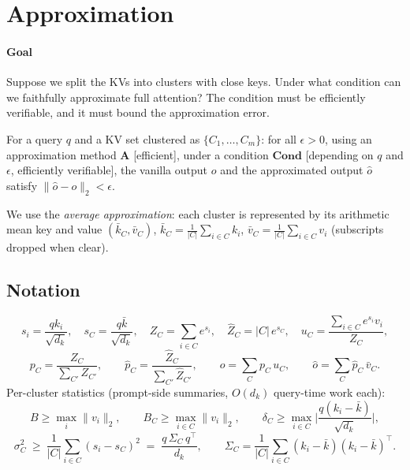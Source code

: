 
\section{Approximation}

\paragraph{Goal}
Suppose we split the KVs into clusters with close keys. Under what condition can we
faithfully approximate full attention? The condition must be efficiently verifiable,
and it must bound the approximation error.

\begin{tcolorbox}[colback=white, colframe=black, arc=0mm, boxrule=0.5pt]
For a query $q$ and a KV set clustered as $\{C_1,\dots,C_m\}$: for all $\epsilon > 0$,
using an approximation method $\mathbf{A}$ [efficient], under a condition
$\mathbf{Cond}$ [depending on $q$ and $\epsilon$, efficiently verifiable], the vanilla
output $o$ and the approximated output $\hat o$ satisfy
$\|\hat o - o\|_2 < \epsilon$.
\end{tcolorbox}

We use the \emph{average approximation}: each cluster is represented by its arithmetic
mean key and value $(\bar k_C, \bar v_C)$, $\bar k_C = \frac{1}{|C|}\sum_{i\in C} k_i$,
$\bar v_C = \frac{1}{|C|}\sum_{i\in C} v_i$ (subscripts dropped when clear).

\subsection{Notation}

\[
s_i = \frac{q k_i}{\sqrt{d_k}}, \quad
s_C = \frac{q \bar k}{\sqrt{d_k}}, \quad
Z_C = \sum_{i\in C} e^{s_i}, \quad
\hat Z_C = |C|\, e^{s_C}, \quad
u_C = \frac{\sum_{i\in C} e^{s_i} v_i}{Z_C},
\]
\[
p_C = \frac{Z_C}{\sum_{C'} Z_{C'}}, \qquad
\hat p_C = \frac{\hat Z_C}{\sum_{C'} \hat Z_{C'}}, \qquad
o = \sum_C p_C\, u_C, \qquad
\hat o = \sum_C \hat p_C\, \bar v_C .
\]
Per-cluster statistics (prompt-side summaries, $O(d_k)$ query-time work each):
\[
B \ge \max_i \|v_i\|_2, \qquad
B_C \ge \max_{i\in C} \|v_i\|_2, \qquad
\delta_C \ge \max_{i\in C} \Big|\frac{q(k_i - \bar k)}{\sqrt{d_k}}\Big|,
\]
\[
\sigma_C^2 \ \ge\ \frac{1}{|C|}\sum_{i\in C}(s_i - s_C)^2
\;=\; \frac{q\, \Sigma_C\, q^\top}{d_k},
\qquad \Sigma_C = \frac{1}{|C|}\sum_{i\in C}(k_i-\bar k)(k_i-\bar k)^\top .
\]

